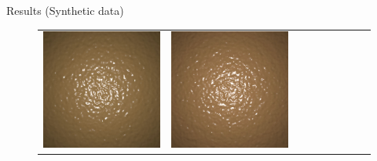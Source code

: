 \documentclass[final]{beamer}
\newlength{\twocolwid}
\newlength{\resultwidth}
\begin{document}
\begin{frame}[t]
\begin{columns}[t]
\begin{column}{\twocolwid}
\begin{block}{Results (Synthetic data)}
\begin{figure}[t]
\begin{tabular}{ccrclcccc}
            		\includegraphics[width=\resultwidth]{images/synth/bump/good1.jpg} &
            		\includegraphics[width=\resultwidth]{images/synth/bump/good2.jpg} &

\end{tabular}
\end{figure}
\end{block}
\end{column}
\end{columns}
\end{frame}
\end{document}
